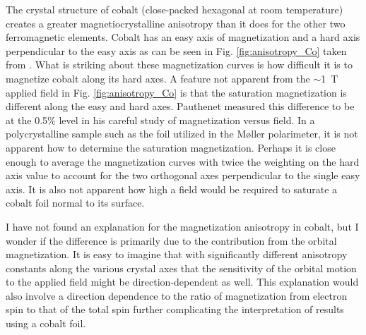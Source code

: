 \documentclass[12pt]{article}
\begin{document}
The crystal structure of cobalt (close-packed hexagonal at room temperature) creates a greater magnetiocrystalline anisotropy than it does for the other two ferromagnetic elements. Cobalt has an easy axis of magnetization and a hard axis perpendicular to the easy axis as can be seen in Fig. \ref{fig:anisotropy_Co} taken from \cite{Cullity2008}. What is striking about these magnetization curves is how difficult it is to magnetize cobalt along its hard axes. A feature not apparent from the $\sim$1~T applied field in Fig. \ref{fig:anisotropy_Co} is that the saturation magnetization is different along the easy and hard axes. Pauthenet measured this difference to be at the 0.5\% level in his careful study of magnetization versus field\cite{PauthenetNov1982}. In a polycrystalline sample such as the foil utilized in the M\o ller polarimeter, it is not apparent how to determine the saturation magnetization. Perhaps it is close enough to average the magnetization curves with twice the weighting on the hard axis value to account for the two orthogonal axes perpendicular to the single easy axis. It is also not apparent how high a field would be required to saturate a cobalt foil normal to its surface.

I have not found an explanation for the magnetization anisotropy in cobalt, but I wonder if the difference is primarily due to the contribution from the orbital magnetization. It is easy to imagine that with significantly different anisotropy constants along the various crystal axes that the sensitivity of the orbital motion to the applied field might be direction-dependent as well. This explanation would also involve a direction dependence to the ratio of magnetization from electron spin to that of the total spin further complicating the interpretation of results using a cobalt foil. 
\end{document}
